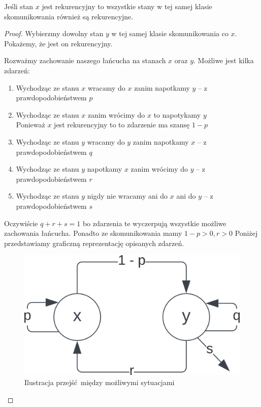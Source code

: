 \begin{lemma}
    Jeśli stan \(x\) jest rekurencyjny to
    wszystkie stany w tej samej klasie skomunikowania również są rekurencyjne.
\end{lemma}
\begin{proof}
    Wybierzmy dowolny stan \( y \) w tej samej klasie skomunikowania co \( x \).
    Pokażemy, że jest on rekurencyjny.
    
    Rozważmy zachowanie naszego łańcucha na stanach \( x \) oraz \( y \).
    Możliwe jest kilka zdarzeń:
    \begin{enumerate}
        \item Wychodząc ze stanu \( x \) wracamy do \( x \) zanim napotkamy \( y \) -- z prawdopodobieństwem \( p \)
        
        \item Wychodząc ze stanu \( x \) zanim wrócimy do \( x \) to napotykamy \( y \) \\
            Ponieważ \( x \) jest rekurencyjny to to zdarzenie ma szansę \( 1 - p \)
            
        \item Wychodząc ze stanu \( y \) wracamy do \( y \) zanim napotkamy \( x \) -- z prawdopodobieństwem \( q \)
        \item Wychodząc ze stanu \( y \) napotkamy \( x \) zanim wrócimy do \( y \) -- z prawdopodobieństwem \( r \)
        
        \item Wychodząc ze stanu \( y \) nigdy nie wracamy ani do \( x \) ani do \( y \) -- z prawdopodobieństwem \( s \)
    \end{enumerate}
    Oczywiście \( q + r + s = 1 \) bo zdarzenia te wyczerpują wszystkie możliwe zachowania łańcucha.
    Ponadto ze skomunikowania mamy \( 1 - p > 0, r > 0 \)
    Poniżej przedstawiamy graficzną reprezentację opisanych zdarzeń.
    
    \begin{figure}[H]
        \centering
        \includegraphics{img/markov-chains/recurrent-communicated-a-priori.png}
        \caption{Ilustracja przejść między możliwymi sytuacjami}
    \end{figure}
    

\end{proof}
